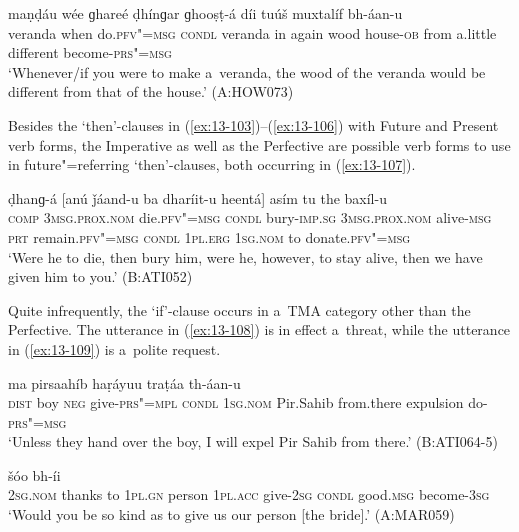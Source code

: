 \begin{exe}
\ex
\label{ex:13-106}
 maṇḍáu wée  ɡhareé ḍhínɡar ɡhooṣṭ-á díi tuúš muxtalíf bh-áan-u  \\
veranda when do.\textsc{pfv"=msg} \textsc{condl} veranda in  again wood house-\textsc{ob} from a.little different become-\textsc{prs"=msg} \\
\glt `Whenever/if you were to make a~veranda, the wood of the veranda would be different from that of the house.' (A:HOW073) 
\end{exe}

Besides the `then'-clauses in (\ref{ex:13-103})--(\ref{ex:13-106}) with Future and Present verb forms, the Imperative as well as the Perfective are possible verb forms to use in future"=referring `then'-clauses, both occurring in (\ref{ex:13-107}).

\begin{exe}
\ex
\label{ex:13-107}
 ḍhanɡ-á  [anú ǰáand-u ba dharíit-u
  heentá]  asím tu the baxíl-u \\
\textsc{comp} \textsc{3msg.prox.nom} die.\textsc{pfv"=msg} \textsc{condl} bury-\textsc{imp.sg}  \textsc{3msg.prox.nom} alive-\textsc{msg} \textsc{prt} remain.\textsc{pfv"=msg} \textsc{condl}  \textsc{1pl.erg} \textsc{1sg.nom} to donate.\textsc{pfv"=msg} \\
\glt `Were he to die, then bury him, were he, however, to stay alive, then we have given him to you.' (B:ATI052) 
\end{exe}

Quite infrequently, the `if'-clause occurs in a~TMA category other than the Perfective. The utterance in (\ref{ex:13-108}) is in effect a~threat, while the utterance in (\ref{ex:13-109}) is a~polite request.

\begin{exe}
\ex
\label{ex:13-108}
 ma  pirsaahíb haṛáyuu traṭáa th-áan-u \\
 \textsc{dist}{\protect\footnotemark} boy \textsc{neg} give-\textsc{prs"=mpl} \textsc{condl} \textsc{1sg.nom}  Pir.Sahib  from.there expulsion do-\textsc{prs"=msg} \\
\glt `Unless they hand over the boy, I will expel Pir Sahib from there.' (B:ATI064-5)

\ex
\label{ex:13-109}
 šóo bh-íi  \\
\textsc{2sg.nom} thanks to \textsc{1pl.gn} person \textsc{1pl.acc} give-\textsc{2sg}  \textsc{condl} good.\textsc{msg} become-\textsc{3sg} \\
\glt `Would you be so kind as to give us our person [the bride].' (A:MAR059) 
\end{exe}

